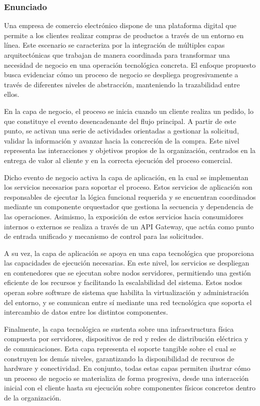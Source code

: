 \subsubsection{Enunciado}
\noindent
Una empresa de comercio electrónico dispone de una plataforma digital que permite a los clientes realizar compras de productos a través de un entorno en línea. Este escenario se caracteriza por la integración de múltiples capas arquitectónicas que trabajan de manera coordinada para transformar una necesidad de negocio en una operación tecnológica concreta. El enfoque propuesto busca evidenciar cómo un proceso de negocio se despliega progresivamente a través de diferentes niveles de abstracción, manteniendo la trazabilidad entre ellos.

En la capa de negocio, el proceso se inicia cuando un cliente realiza un pedido, lo que constituye el evento desencadenante del flujo principal. A partir de este punto, se activan una serie de actividades orientadas a gestionar la solicitud, validar la información y avanzar hacia la concreción de la compra. Este nivel representa las interacciones y objetivos propios de la organización, centrados en la entrega de valor al cliente y en la correcta ejecución del proceso comercial.

Dicho evento de negocio activa la capa de aplicación, en la cual se implementan los servicios necesarios para soportar el proceso. Estos servicios de aplicación son responsables de ejecutar la lógica funcional requerida y se encuentran coordinados mediante un componente orquestador que gestiona la secuencia y dependencia de las operaciones. Asimismo, la exposición de estos servicios hacia consumidores internos o externos se realiza a través de un API Gateway, que actúa como punto de entrada unificado y mecanismo de control para las solicitudes.

A su vez, la capa de aplicación se apoya en una capa tecnológica que proporciona las capacidades de ejecución necesarias. En este nivel, los servicios se despliegan en contenedores que se ejecutan sobre nodos servidores, permitiendo una gestión eficiente de los recursos y facilitando la escalabilidad del sistema. Estos nodos operan sobre software de sistema que habilita la virtualización y administración del entorno, y se comunican entre sí mediante una red tecnológica que soporta el intercambio de datos entre los distintos componentes.

Finalmente, la capa tecnológica se sustenta sobre una infraestructura física compuesta por servidores, dispositivos de red y redes de distribución eléctrica y de comunicaciones. Esta capa representa el soporte tangible sobre el cual se construyen los demás niveles, garantizando la disponibilidad de recursos de hardware y conectividad. En conjunto, todas estas capas permiten ilustrar cómo un proceso de negocio se materializa de forma progresiva, desde una interacción inicial con el cliente hasta su ejecución sobre componentes físicos concretos dentro de la organización.

